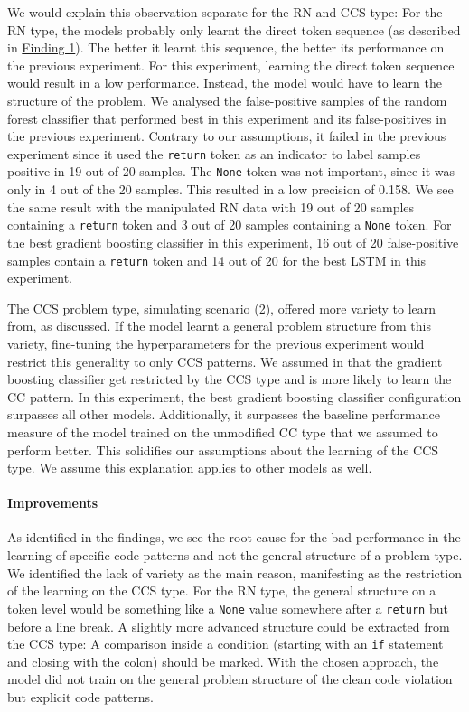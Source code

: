 We would explain this observation separate for the RN and CCS type:
For the RN type, the models probably only learnt the direct token sequence (as described in \hyperref[finding:return_none_manipulated_bad]{Finding 1}). The better it learnt this sequence, the better its performance on the previous experiment. For this experiment, learning the direct token sequence would result in a low performance. Instead, the model would have to learn the structure of the problem. 
We analysed the false-positive samples of the random forest classifier that performed best in this experiment and its false-positives in the previous experiment. Contrary to our assumptions, it failed in the previous experiment since it used the \texttt{return} token as an indicator to label samples positive in 19 out of 20 samples. The \texttt{None} token was not important, since it was only in 4 out of the 20 samples. This resulted in a low precision of 0.158. We see the same result with the manipulated RN data with 19 out of 20 samples containing a \texttt{return} token and 3 out of 20 samples containing a \texttt{None} token. For the best gradient boosting classifier in this experiment, 16 out of 20 false-positive samples contain a \texttt{return} token and 14 out of 20 for the best LSTM in this experiment.


The CCS problem type, simulating scenario (2), offered more variety to learn from, as discussed. If the model learnt a general problem structure from this variety, fine-tuning the hyperparameters for the previous experiment would restrict this generality to only CCS patterns. We assumed in  that the gradient boosting classifier get restricted by the CCS type and is more likely to learn the CC pattern. In this experiment, the best gradient boosting classifier configuration surpasses all other models. Additionally, it surpasses the baseline performance measure of the model trained on the unmodified CC type that we assumed to perform better. This solidifies our assumptions about the learning of the CCS type. We assume this explanation applies to other models as well.


\paragraph{Improvements}
As identified in the findings, we see the root cause for the bad performance in the learning of specific code patterns and not the general structure of a problem type. We identified the lack of variety as the main reason, manifesting as the restriction of the learning on the CCS type. For the RN type, the general structure on a token level would be something like a \texttt{None} value somewhere after a \texttt{return} but before a line break. A slightly more advanced structure could be extracted from the CCS type: A comparison inside a condition (starting with an \texttt{if} statement and closing with the colon) should be marked. With the chosen approach, the model did not train on the general problem structure of the clean code violation but explicit code patterns. 

